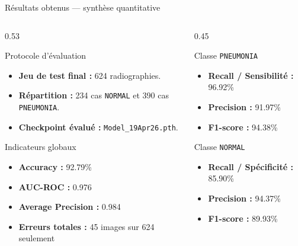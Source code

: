 \begin{frame}{Résultats obtenus — synthèse quantitative}
\footnotesize
\begin{columns}[T,onlytextwidth]
\begin{column}{0.53\textwidth}
\begin{block}{Protocole d'évaluation}
\begin{itemize}
\item \textbf{Jeu de test final :} 624 radiographies.
\item \textbf{Répartition :} 234 cas \texttt{NORMAL} et 390 cas \texttt{PNEUMONIA}.
\item \textbf{Checkpoint évalué :} \texttt{Model\_19Apr26.pth}.
\end{itemize}
\end{block}
\begin{block}{Indicateurs globaux}
\begin{itemize}
\item \textbf{Accuracy :} 92.79\%
\item \textbf{AUC-ROC :} 0.976
\item \textbf{Average Precision :} 0.984
\item \textbf{Erreurs totales :} 45 images sur 624 seulement
\end{itemize}
\end{block}
\end{column}
\begin{column}{0.45\textwidth}
\begin{block}{Classe \texttt{PNEUMONIA}}
\begin{itemize}
\item \textbf{Recall / Sensibilité :} 96.92\%
\item \textbf{Precision :} 91.97\%
\item \textbf{F1-score :} 94.38\%
\end{itemize}
\end{block}
\begin{block}{Classe \texttt{NORMAL}}
\begin{itemize}
\item \textbf{Recall / Spécificité :} 85.90\%
\item \textbf{Precision :} 94.37\%
\item \textbf{F1-score :} 89.93\%
\end{itemize}
\end{block}
\end{column}
\end{columns}
\end{frame}

